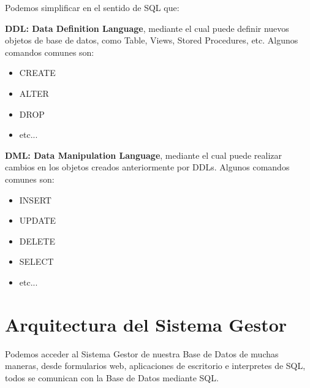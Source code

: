 \documentclass[12pt, fleqn]{report}                             %
\begin{document}
            Podemos simplificar en el sentido de SQL que:

            \textbf{DDL: Data Definition Language}, mediante el cual puede definir nuevos objetos
            de base de datos, como Table, Views, Stored Procedures, etc.
            Algunos comandos comunes son:

            \begin{itemize}
                \item CREATE
                \item ALTER
                \item DROP
                \item etc...
            \end{itemize}


            \textbf{DML: Data Manipulation Language}, mediante el cual puede realizar cambios en
            los objetos creados anteriormente por DDLs. Algunos comandos comunes son:

            \begin{itemize}
                \item INSERT
                \item UPDATE
                \item DELETE
                \item SELECT
                \item etc...
            \end{itemize}




        \clearpage
        \section{Arquitectura del Sistema Gestor}

            Podemos acceder al Sistema Gestor de nuestra Base de Datos de muchas maneras, 
            desde formularios web, aplicaciones de escritorio e interpretes de SQL, todos se
            comunican con la Base de Datos mediante SQL.
\end{document}
